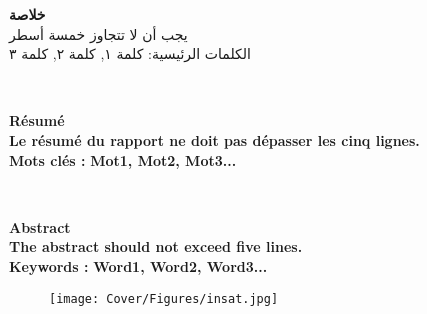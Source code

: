 \documentclass[oneside,12pt]{Classes/aesm_edspia}
\begin{document}
\setlength{\parindent}{0pt}
\setlength{\topmargin}{0mm}
\setlength{\headheight}{0cm}
\setlength{\headsep}{0cm}
\setlength{\textheight}{20cm}
\setlength{\textwidth}{17cm}
\setlength{\marginparsep}{0cm}
\setlength{\marginparwidth}{0cm}
\setlength{\headheight}{0cm}
\setlength{\footskip}{0cm}

\pagestyle{fancy}


\begin{center}
\hbox{\raisebox{0.2em}{\vrule depth 0pt height 1pt width 17cm}}
\end{center}
\begin{minipage}[c]{\textwidth}
  \textbf{خلاصة}\\ [0.4cm]
\footnotesize
يجب أن لا تتجاوز خمسة أسطر \\[0.4cm]
الكلمات الرئيسية:
    كلمة ١, كلمة ٢, كلمة ٣
\end{minipage}
\\[1.5cm]
\begin{center}
\hbox{\raisebox{0.2em}{\vrule depth 0pt height 1pt width 17cm}}
\end{center}
\begin{minipage}[c]{\textwidth}
\textbf{Résumé}\\[0.4cm]
\footnotesize
\textbf{Le résumé du rapport ne doit pas dépasser les cinq lignes.}
\\[0.4cm]
\textbf{Mots clés :} \textbf{Mot1, Mot2, Mot3...}
\end{minipage}
\\[1.5cm]
\begin{center}
\hbox{\raisebox{0.2em}{\vrule depth 0pt height 1pt width 17cm}}
\end{center}
\begin{minipage}[c]{\textwidth}
\textbf{Abstract}\\[0.4cm]
\footnotesize
\textbf{The abstract should not exceed five lines. }
\\[0.4cm]
\textbf{Keywords :} \textbf{Word1, Word2, Word3...}
\end{minipage}%
\begin{center}
\begin{figure}
\texttt{[image: Cover/Figures/insat.jpg]}
\end{figure}
\end{center}

\renewcommand{\footrulewidth}{1pt}
\fancyfoot[L]{}
\fancyfoot[R]{}
\end{document}

